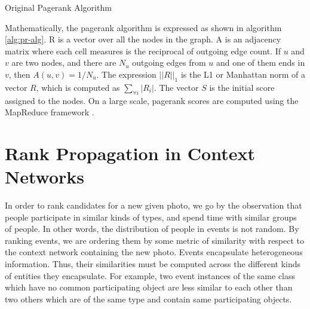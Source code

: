 \SetAlgoSkip{}
\begin{algorithm}[h!]
\dontprintsemicolon 
{}
\caption{Original Pagerank Algorithm}
\label{alg:pr-alg}
\end{algorithm}

Mathematically, the pagerank algorithm is expressed as shown in algorithm \ref{alg:pr-alg}. R is a vector over all the nodes in the graph. A is an adjacency matrix where each cell measures is the reciprocal of outgoing edge count. If $u$ and $v$ are two nodes, and there are $N_u$ outgoing edges from $u$ and one of them ends in $v$, then $A(u, v) = 1/N_u$. The expression $||R||_1$ is the L1 or Manhattan norm of a vector $R$, which is computed as $\sum_{\forall i} |R_i|$. The vector $S$ is the initial score assigned to the nodes. On a large scale, pagerank scores are computed using the MapReduce framework \cite{dean2008mapreduce}.

\section{Rank Propagation in Context Networks}

In order to rank candidates for a new given photo, we go by the observation that people participate in similar kinds of types, and spend time with similar groups of people. In other words, the distribution of people in events is not random. By ranking events, we are ordering them by some metric of similarity with respect to the context network containing the new photo. Events encapsulate heterogeneous information. Thus, their similarities must be computed across the different kinds of entities they encapsulate. For example, two event instances of the same class which have no common participating object are less similar to each other than two others which are of the same type and contain same participating objects.

